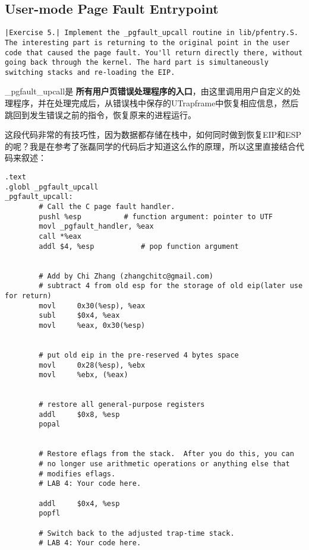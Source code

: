 \documentclass{article}
\newcommand{\highlight}[1]{{\bfseries \color{red}  #1}}
\begin{document}
\begin{CJK*}{UTF8}{gkai}
\subsection{User-mode Page Fault Entrypoint}

\begin{lstlisting}[style=exercise]
|Exercise 5.| Implement the _pgfault_upcall routine in lib/pfentry.S. The interesting part is returning to the original point in the user code that caused the page fault. You'll return directly there, without going back through the kernel. The hard part is simultaneously switching stacks and re-loading the EIP.
\end{lstlisting}

\_pgfault\_upcall是\highlight{所有用户页错误处理程序的入口}，由这里调用用户自定义的处理程序，并在处理完成后，从错误栈中保存的UTrapframe中恢复相应信息，然后跳回到发生错误之前的指令，恢复原来的进程运行。

这段代码非常的有技巧性，因为数据都存储在栈中，如何同时做到恢复EIP和ESP的呢？我是在参考了张磊同学的代码后才知道这么作的原理，所以这里直接结合代码来叙述：

\begin{lstlisting}[style=acode, title={\scriptsize \ttfamily \bfseries lib/pfentry.S}]
.text
.globl _pgfault_upcall
_pgfault_upcall:
        # Call the C page fault handler.
        pushl %esp			# function argument: pointer to UTF
        movl _pgfault_handler, %eax
        call *%eax
        addl $4, %esp			# pop function argument
	

        # Add by Chi Zhang (zhangchitc@gmail.com)
        # subtract 4 from old esp for the storage of old eip(later use for return)
        movl     0x30(%esp), %eax
        subl     $0x4, %eax
        movl     %eax, 0x30(%esp)


        # put old eip in the pre-reserved 4 bytes space
        movl     0x28(%esp), %ebx
        movl     %ebx, (%eax)

    
        # restore all general-purpose registers
        addl     $0x8, %esp
        popal


        # Restore eflags from the stack.  After you do this, you can
        # no longer use arithmetic operations or anything else that
        # modifies eflags.
        # LAB 4: Your code here.

        addl     $0x4, %esp
        popfl

        # Switch back to the adjusted trap-time stack.
        # LAB 4: Your code here.


\end{lstlisting}
\end{CJK*}
\end{document}
